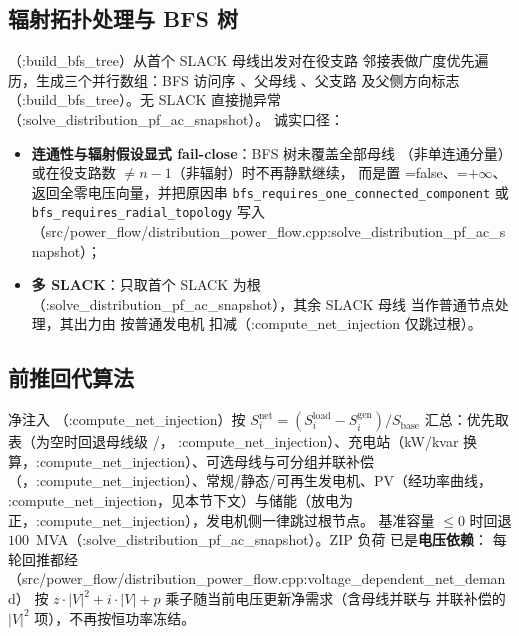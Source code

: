\subsection{辐射拓扑处理与 BFS 树}
（:build\_bfs\_tree）从首个 SLACK 母线出发对在役支路
邻接表做广度优先遍历，生成三个并行数组：BFS 访问序 、父母线
、父支路  及父侧方向标志
（:build\_bfs\_tree）。无 SLACK 直接抛异常（:solve\_distribution\_pf\_ac\_snapshot）。
诚实口径：
\begin{itemize}
  \item \textbf{连通性与辐射假设显式 fail-close}：BFS 树未覆盖全部母线
        （非单连通分量）或在役支路数 $\neq n-1$（非辐射）时不再静默继续，
        而是置 =false、=$+\infty$、
        返回全零电压向量，并把原因串
        \texttt{bfs\_requires\_one\_connected\_component} 或
        \texttt{bfs\_requires\_radial\_topology} 写入
        （src/power\_flow/distribution\_power\_flow.cpp:solve\_distribution\_pf\_ac\_snapshot）；
  \item \textbf{多 SLACK}：只取首个 SLACK 为根（:solve\_distribution\_pf\_ac\_snapshot），其余 SLACK 母线
        当作普通节点处理，其出力由  按普通发电机
        扣减（:compute\_net\_injection 仅跳过根）。
\end{itemize}

\subsection{前推回代算法}
净注入 （:compute\_net\_injection）按
$S^{\mathrm{net}}_i=(S^{\mathrm{load}}_i-S^{\mathrm{gen}}_i)/S_{\mathrm{base}}$
汇总：优先取  表（为空时回退母线级 /，
:compute\_net\_injection）、充电站（kW/kvar 换算，:compute\_net\_injection）、可选母线与可分组并联补偿
（，:compute\_net\_injection）、常规/静态/可再生发电机、PV（经功率曲线，
:compute\_net\_injection，见本节下文）与储能（放电为正，:compute\_net\_injection），发电机侧一律跳过根节点。
基准容量 $\le 0$ 时回退 $100$~MVA（:solve\_distribution\_pf\_ac\_snapshot）。ZIP 负荷
已是\textbf{电压依赖}： 每轮回推都经
（src/power\_flow/distribution\_power\_flow.cpp:voltage\_dependent\_net\_demand）
按 $z\cdot|V|^2+i\cdot|V|+p$ 乘子随当前电压更新净需求（含母线并联与
并联补偿的 $|V|^2$ 项），不再按恒功率冻结。

